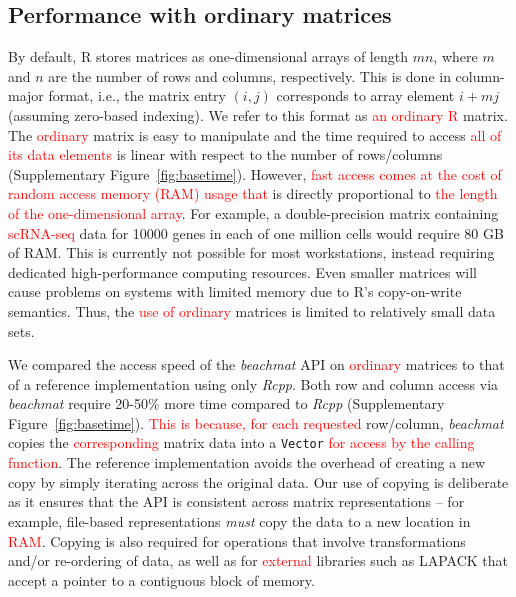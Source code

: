 \documentclass{article}
\newcommand{\beachmat}{\textit{beachmat}}
\newcommand{\code}[1]{\texttt{#1}}
\newcommand{\revised}[1]{\textcolor{red}{#1}}
\begin{document}
\subsection{Performance with ordinary matrices}
By default, R stores matrices as one-dimensional arrays of length $mn$, where $m$ and $n$ are the number of rows and columns, respectively.
This is done in column-major format, i.e., the matrix entry $(i, j)$ corresponds to array element $i + mj$ (assuming zero-based indexing).
We refer to this format as \revised{an ordinary R} matrix.
The \revised{ordinary} matrix is easy to manipulate and the time required to access \revised{all of its data elements} is linear with respect to the number of rows/columns (Supplementary Figure~\ref{fig:basetime}).
However, \revised{fast access comes at the cost of random access memory (RAM) usage that} is directly proportional to \revised{the length of the one-dimensional array}.
For example, a double-precision matrix containing \revised{scRNA-seq} data for 10000 genes in each of one million cells would require 80 GB of RAM.
This is currently not possible for most workstations, instead requiring dedicated high-performance computing resources.
Even smaller matrices will cause problems on systems with limited memory due to R's copy-on-write semantics.
Thus, the \revised{use of ordinary} matrices is limited to relatively small data sets.


We compared the access speed of the \beachmat{} API on \revised{ordinary} matrices to that of a reference implementation using only \textit{Rcpp}.
Both row and column access via \beachmat{} require 20-50\% more time compared to \textit{Rcpp} (Supplementary Figure~\ref{fig:basetime}).
\revised{This is because, for each requested} row/column, \beachmat{} copies the \revised{corresponding} matrix data into a \code{Vector} \revised{for access by the calling function}.
The reference implementation avoids the overhead of creating a new copy by simply iterating across the original data.
Our use of copying is deliberate as it ensures that the API is consistent across matrix representations -- for example, file-based representations \textit{must} copy the data to a new location in \revised{RAM}.
Copying is also required for operations that involve transformations and/or re-ordering of data, as well as for \revised{external} libraries such as LAPACK that accept a pointer to a contiguous block of memory.
\end{document}

